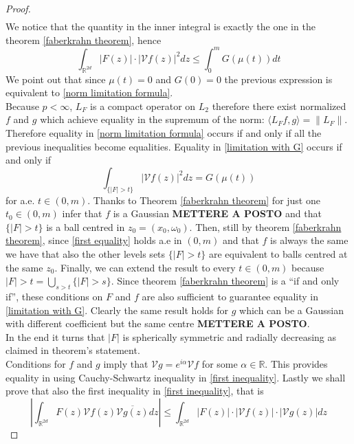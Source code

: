\documentclass[corpo=11pt, stile=classica, tipotesi=custom,
greek, evenboxes, english]{toptesi}
\numberwithin{equation}{chapter}
\newcommand{\R}{\mathbb{R}} %
\newcommand{\V}{\mathcal{V}} %
\begin{document}
\begin{proof}
\begin{align*}
	\end{align*}
	We notice that the quantity in the inner integral is exactly the one in the theorem \ref{faberkrahn theorem}, hence
	\begin{equation}\label{limitation with G}
		\int_{\R^{2d}} |F(z)| \cdot |\V f(z)|^2 dz \leq \int_0^m G(\mu(t)) dt
	\end{equation}
	We point out that since $\mu(t) = 0$ and $G(0)=0$ the previous expression is equivalent to \eqref{norm limitation formula}.\\
	Because $p<\infty$, $L_F$ is a compact operator on $L_2$ therefore there exist normalized $f$ and $g$ which achieve equality in the supremum of the norm: $\langle L_F f, g \rangle = \| L_F \|$. Therefore equality in \eqref{norm limitation formula} occurs if and only if all the previous inequalities become equalities. Equality in \eqref{limitation with G} occurs if and only if
	\begin{equation}\label{first equality}
		\int_{\{|F|>t\}} |\V f(z)|^2 dz = G(\mu(t))
	\end{equation}
	for a.e. $t \in (0,m)$. Thanks to Theorem \ref{faberkrahn theorem} for just one $t_0 \in (0,m)$ infer that $f$ is a Gaussian \textbf{METTERE A POSTO} and that $\{|F|>t\}$ is a ball centred in $z_0 = (x_0,\omega_0)$. Then, still by theorem \ref{faberkrahn theorem}, since \eqref{first equality} holds a.e in $(0,m)$ and that $f$ is always the same we have that also the other levels sets $\{|F|>t\}$ are equivalent to balls centred at the same $z_0$. Finally, we can extend the result to every $t \in (0,m)$ because ${|F|>t} = \bigcup_{s > t} \{|F|>s\}$. Since theorem \ref{faberkrahn theorem} is a ``if and only if'', these conditions on $F$ and $f$ are also sufficient to guarantee equality in \eqref{limitation with G}. Clearly the same result holds for $g$ which can be a Gaussian with different coefficient but the same centre \textbf{METTERE A POSTO}.\\
	In the end it turns that $|F|$ is spherically symmetric and radially decreasing as claimed in theorem's statement.\\
	Conditions for $f$ and $g$ imply that $\V g  = e^{i \alpha} \V f$ for some $\alpha \in \R$. This provides equality in using Cauchy-Schwartz inequality in \eqref{first inequality}. Lastly we shall prove that also the first inequality in \eqref{first inequality}, that is
	\begin{equation*}
		\left\vert \int_{\R^{2d}} F(z) \V f(z) \overline{\V g(z)} dz \right\vert \leq \int_{\R^{2d}} |F(z)| \cdot | \V f(z)| \cdot |\V g(z)| dz

\end{equation*}
\end{proof}
\end{document}
